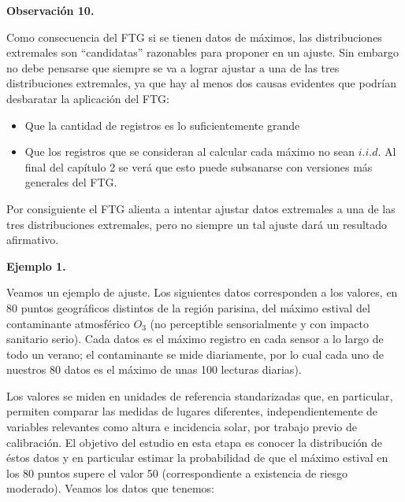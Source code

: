 \documentclass[
  oneside]{article}
\begin{document}
\textbf{Observación 10.}

Como consecuencia del FTG si se tienen datos de máximos, las
distribuciones extremales son ``candidatas'' razonables para proponer en
un ajuste. Sin embargo no debe pensarse que siempre se va a lograr
ajustar a una de las tres distribuciones extremales, ya que hay al menos
dos causas evidentes que podrían desbaratar la aplicación del FTG:

\begin{itemize}
\item Que la cantidad de registros es lo suficientemente grande
\item Que los registros que se consideran al calcular cada máximo no sean $i.i.d$. Al final del capítulo 2 se verá que esto puede subsanarse con versiones más generales del FTG.
\end{itemize}

Por consiguiente el FTG alienta a intentar ajustar datos extremales a
una de las tres distribuciones extremales, pero no siempre un tal ajuste
dará un resultado afirmativo.

\textbf{Ejemplo 1.}

Veamos un ejemplo de ajuste. Los siguientes datos corresponden a los
valores, en 80 puntos geográficos distintos de la región parisina, del
máximo estival del contaminante atmosférico \(O_3\) (no perceptible
sensorialmente y con impacto sanitario serio). Cada datos es el máximo
registro en cada sensor a lo largo de todo un verano; el contaminante se
mide diariamente, por lo cual cada uno de nuestros 80 datos es el máximo
de unas 100 lecturas diarias).

Los valores se miden en unidades de referencia standarizadas que, en
particular, permiten comparar las medidas de lugares diferentes,
independientemente de variables relevantes como altura e incidencia
solar, por trabajo previo de calibración. El objetivo del estudio en
esta etapa es conocer la distribución de éstos datos y en particular
estimar la probabilidad de que el máximo estival en los 80 puntos supere
el valor 50 (correspondiente a existencia de riesgo moderado). Veamos
los datos que tenemos:
\end{document}
